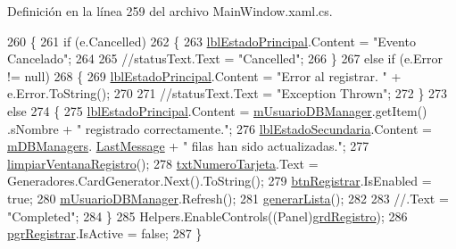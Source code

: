 Definición en la línea 259 del archivo Main\-Window.\-xaml.\-cs.


\begin{DoxyCode}
260         \{
261             \textcolor{keywordflow}{if} (e.Cancelled)
262             \{
263                 \hyperlink{class_proyecto___integrador__3_1_1_main_window_a3120ba863f838314aeed5764404c80d5}{lblEstadoPrincipal}.Content = \textcolor{stringliteral}{"Evento Cancelado"};
264 
265                 \textcolor{comment}{//statusText.Text = "Cancelled";}
266             \}
267             \textcolor{keywordflow}{else} \textcolor{keywordflow}{if} (e.Error != null)
268             \{
269                 \hyperlink{class_proyecto___integrador__3_1_1_main_window_a3120ba863f838314aeed5764404c80d5}{lblEstadoPrincipal}.Content = \textcolor{stringliteral}{"Error al registrar. "} + e.Error.ToString();
270 
271                 \textcolor{comment}{//statusText.Text = "Exception Thrown";}
272             \}
273             \textcolor{keywordflow}{else}
274             \{
275                 \hyperlink{class_proyecto___integrador__3_1_1_main_window_a3120ba863f838314aeed5764404c80d5}{lblEstadoPrincipal}.Content = \hyperlink{class_proyecto___integrador__3_1_1_main_window_a471acfe8f7066fc857cbc13023c10ad4}{mUsuarioDBManager}.getItem()
      .sNombre + \textcolor{stringliteral}{" registrado correctamente."};
276                 \hyperlink{class_proyecto___integrador__3_1_1_main_window_ab3c46fae3b8ee53389013b8cc0426f77}{lblEstadoSecundaria}.Content = \hyperlink{class_proyecto___integrador__3_1_1_main_window_ad2b88cf68cee145343b2da734c94d8d5}{mDBManagers}.
      \hyperlink{class_proyecto___integrador__3_1_1_d_b_managers_aecf2d3981e87f16c1e3a60c7913931a8}{LastMessage} + \textcolor{stringliteral}{" filas han sido actualizadas."};
277                 \hyperlink{class_proyecto___integrador__3_1_1_main_window_a1d010d4a4b67fd7ffd813ca7112a36c0}{limpiarVentanaRegistro}();
278                 \hyperlink{class_proyecto___integrador__3_1_1_main_window_aa002c65e1d03d58932cae92c7523198a}{txtNumeroTarjeta}.Text = Generadores.CardGenerator.Next().ToString();
279                 \hyperlink{class_proyecto___integrador__3_1_1_main_window_ac1b64fa55a6742a8f529987bfd452c80}{btnRegistrar}.IsEnabled = \textcolor{keyword}{true};
280                 \hyperlink{class_proyecto___integrador__3_1_1_main_window_a471acfe8f7066fc857cbc13023c10ad4}{mUsuarioDBManager}.Refresh();
281                 \hyperlink{class_proyecto___integrador__3_1_1_main_window_a524b3904582404e525a70f8ceac96e7d}{generarLista}();
282 
283                 \textcolor{comment}{//.Text = "Completed";}
284             \}
285             Helpers.EnableControls((Panel)\hyperlink{class_proyecto___integrador__3_1_1_main_window_a9386928aff943060071efe864b17ca03}{grdRegistro});
286             \hyperlink{class_proyecto___integrador__3_1_1_main_window_a3013e3941492422c2fb9151f99f5d3ef}{pgrRegistrar}.IsActive = \textcolor{keyword}{false};
287         \}
\end{DoxyCode}
